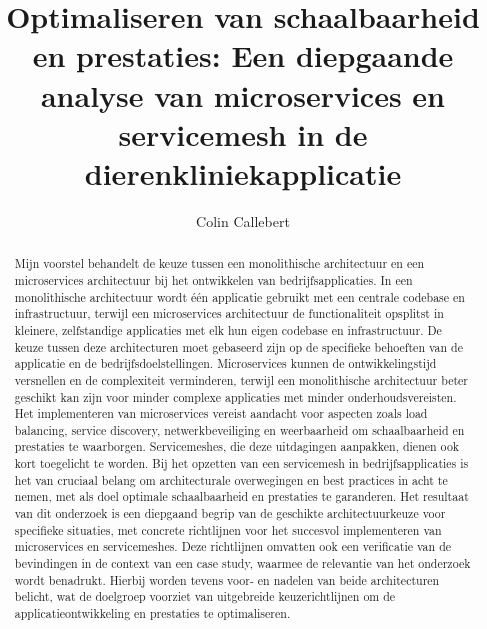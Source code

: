 \documentclass{hogent-article}
\title{Optimaliseren van schaalbaarheid en prestaties: Een diepgaande analyse van microservices en servicemesh in de dierenkliniekapplicatie}
\author{Colin Callebert}
\begin{document}
\begin{abstract}
  Mijn voorstel behandelt de keuze tussen een monolithische architectuur en een microservices architectuur bij het ontwikkelen van bedrijfsapplicaties. In een monolithische architectuur wordt één applicatie gebruikt met een centrale codebase en infrastructuur, terwijl een microservices architectuur de functionaliteit opsplitst in kleinere, zelfstandige applicaties met elk hun eigen codebase en infrastructuur. De keuze tussen deze architecturen moet gebaseerd zijn op de specifieke behoeften van de applicatie en de bedrijfsdoelstellingen. Microservices kunnen de ontwikkelingstijd versnellen en de complexiteit verminderen, terwijl een monolithische architectuur beter geschikt kan zijn voor minder complexe applicaties met minder onderhoudsvereisten. Het implementeren van microservices vereist aandacht voor aspecten zoals load balancing, service discovery, netwerkbeveiliging en weerbaarheid om schaalbaarheid en prestaties te waarborgen. Servicemeshes, die deze uitdagingen aanpakken, dienen ook kort toegelicht te worden. Bij het opzetten van een servicemesh in bedrijfsapplicaties is het van cruciaal belang om architecturale overwegingen en best practices in acht te nemen, met als doel optimale schaalbaarheid en prestaties te garanderen. Het resultaat van dit onderzoek is een diepgaand begrip van de geschikte architectuurkeuze voor specifieke situaties, met concrete richtlijnen voor het succesvol implementeren van microservices en servicemeshes. Deze richtlijnen omvatten ook een verificatie van de bevindingen in de context van een case study, waarmee de relevantie van het onderzoek wordt benadrukt. Hierbij worden tevens voor- en nadelen van beide architecturen belicht, wat de doelgroep voorziet van uitgebreide keuzerichtlijnen om de applicatieontwikkeling en prestaties te optimaliseren.
\end{abstract}

\tableofcontents



\printbibliography[heading=bibintoc]
\end{document}
